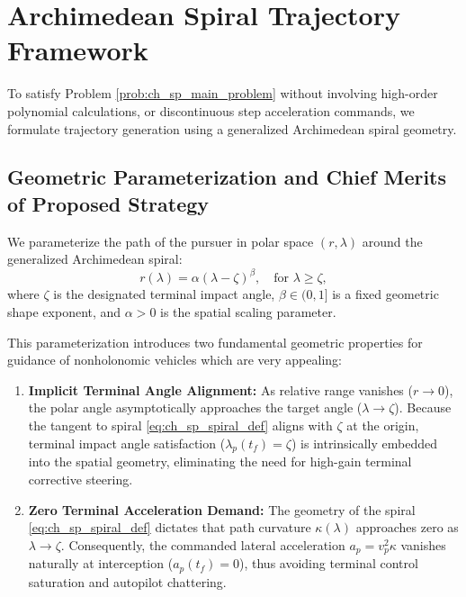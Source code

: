 \section{Archimedean Spiral Trajectory Framework}\label{sec:ch_sp_spiral_framework}
\leavevmode\par\noindent
To satisfy Problem \ref{prob:ch_sp_main_problem} without involving high-order polynomial calculations, or discontinuous step acceleration commands, we formulate trajectory generation using a generalized Archimedean spiral geometry.
\subsection{Geometric Parameterization and Chief Merits of Proposed Strategy}\label{subsec:ch_sp_spiral_def}

We parameterize the path of the pursuer in polar space $(r, \lambda)$ around the generalized Archimedean spiral:
\begin{equation}\label{eq:ch_sp_spiral_def}
	r(\lambda) = \alpha (\lambda - \zeta)^\beta, \quad \text{for } \lambda \ge \zeta,
\end{equation}
where $\zeta$ is the designated terminal impact angle, $\beta \in (0, 1]$ is a fixed geometric shape exponent, and $\alpha > 0$ is the spatial scaling parameter.

This parameterization introduces two fundamental geometric properties for guidance of nonholonomic vehicles which are very appealing:

\begin{enumerate}
    \item \textbf{Implicit Terminal Angle Alignment:} As relative range vanishes ($r \to 0$), the polar angle asymptotically approaches the target angle ($\lambda \to \zeta$). Because the tangent to spiral \eqref{eq:ch_sp_spiral_def} aligns with $\zeta$ at the origin, terminal impact angle satisfaction ($\lambda_p(t_f) = \zeta$) is intrinsically embedded into the spatial geometry, eliminating the need for high-gain terminal corrective steering.
    
    \item \textbf{Zero Terminal Acceleration Demand:} The geometry of the spiral \eqref{eq:ch_sp_spiral_def} dictates that path curvature $\kappa(\lambda)$ approaches zero as $\lambda \to \zeta$. Consequently, the commanded lateral acceleration $a_p = v_p^2 \kappa$ vanishes naturally at interception ($a_p(t_f) = 0$), thus avoiding terminal control saturation and autopilot chattering.
\end{enumerate}
